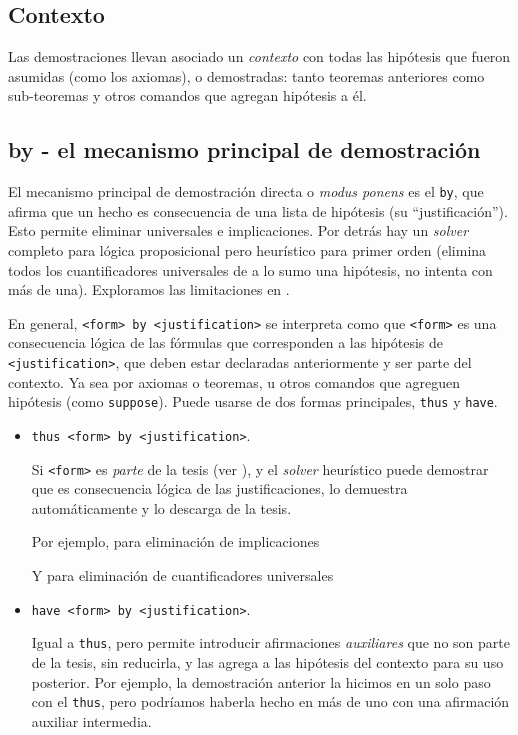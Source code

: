 \subsection{Contexto}

Las demostraciones llevan asociado un \textit{contexto} con todas las hipótesis
que fueron asumidas (como los axiomas), o demostradas: tanto teoremas anteriores
como sub-teoremas y otros comandos que agregan hipótesis a él.

\subsection{by - el mecanismo principal de demostración}

El mecanismo principal de demostración directa o \textit{modus ponens} es el
\lstinline{by}, que afirma que un hecho es consecuencia de una lista de
hipótesis (su ``justificación''). Esto permite eliminar universales e implicaciones. Por detrás hay un
\textit{solver} completo para lógica proposicional pero heurístico para primer
orden (elimina todos los cuantificadores universales de a lo sumo una hipótesis, no intenta con más
de una). Exploramos las limitaciones en .

En general, \lstinline{<form> by <justification>} se interpreta como que
\lstinline{<form>} es una consecuencia lógica de las fórmulas que corresponden a
las hipótesis de \lstinline{<justification>}, que deben estar declaradas
anteriormente y ser parte del contexto. Ya sea por axiomas o teoremas, u otros
comandos que agreguen hipótesis (como \lstinline{suppose}). Puede usarse de dos
formas principales, \lstinline{thus} y \lstinline{have}.

\begin{itemize}
    \item \lstinline{thus <form> by <justification>}.
    
    Si \lstinline{<form>} es \textit{parte} de la tesis (ver
    ), y el \textit{solver} heurístico puede
    demostrar que es consecuencia lógica de las justificaciones, lo demuestra automáticamente y lo descarga de la tesis.

    Por ejemplo, para eliminación de implicaciones

    

    Y para eliminación de cuantificadores universales

    

    \item \lstinline{have <form> by <justification>}.
    
    Igual a \lstinline{thus}, pero permite introducir afirmaciones
    \textit{auxiliares} que no son parte de la tesis, sin reducirla, y las
    agrega a las hipótesis del contexto para su uso posterior. Por ejemplo, la demostración
    anterior la hicimos en un solo paso con el \lstinline{thus}, pero podríamos
    haberla hecho en más de uno con una afirmación auxiliar intermedia.

    
\end{itemize}

